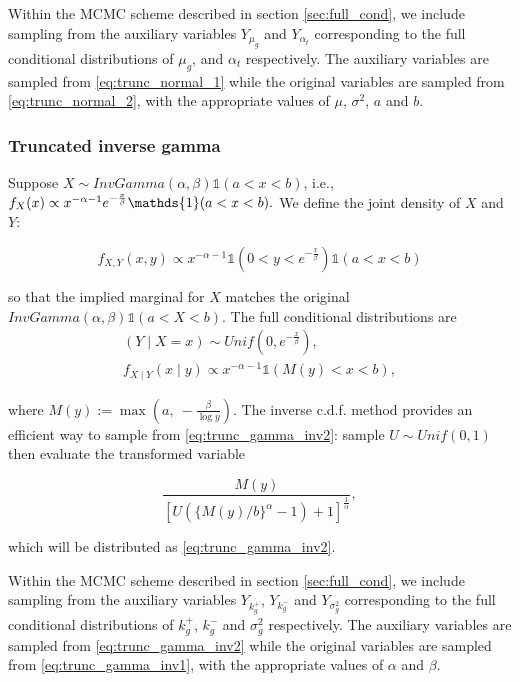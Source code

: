 Within the MCMC scheme described in section \ref{sec:full_cond}, we include sampling from the auxiliary variables $Y_{\mu_g}$ and $Y_{\alpha_t}$ corresponding to the full conditional distributions of $\mu_g$, and $\alpha_t$ respectively. The auxiliary variables are sampled from \eqref{eq:trunc_normal_1} while the original variables are sampled from \eqref{eq:trunc_normal_2}, with the appropriate values of $\mu$, $\sigma^2$, $a$ and $b$.


\subsubsection{Truncated inverse gamma}

Suppose $X \sim InvGamma(\alpha, \beta)\mathds{1}(a<x<b)$, i.e., $f_{X}(x) \propto x^{-\alpha -1} e^{-\frac{x}{\beta}}\\ \mathds{1}(a < x < b).$ We define the joint density of $X$ and $Y$:

$$f_{X,Y}(x, y) \propto x^{-\alpha - 1} \mathds{1}(0<y<e^{-\frac{x}{\beta}})\mathds{1}(a<x<b)$$

\noindent so that the implied marginal for $X$ matches the original $InvGamma(\alpha, \beta)\mathds{1}(a<X<b)$. The full conditional distributions are 
\begin{align}
(Y \mid X=x) \sim Unif(0, e^{-\frac{x}{\beta}}),\label{eq:trunc_gamma_inv1} \\
f_{X\mid Y}(x \mid y) \propto x^{-\alpha -1} \mathds{1}(M(y)<x<b),
\label{eq:trunc_gamma_inv2}
\end{align}

\noindent where $M(y):=\max\left( a, \ -\frac{\beta}{\log y}\right)$. The inverse c.d.f. method provides an efficient way to sample from \eqref{eq:trunc_gamma_inv2}: sample $U \sim Unif(0,1)$ then evaluate the transformed variable 

$$\frac{M(y)}{ \left[U( \{M(y)/b\}^{\alpha} -1 ) + 1\right]^{\frac{1}{\alpha}}},$$

\noindent which  will be distributed as \eqref{eq:trunc_gamma_inv2}. 

Within the MCMC scheme described in section \ref{sec:full_cond}, we include sampling from the auxiliary variables $Y_{k^+_g}$, $Y_{k^-_g}$ and $Y_{\sigma^2_g}$ corresponding to the full conditional distributions of $k^+_g$, $k^-_g$ and $\sigma^2_g$ respectively. The auxiliary variables are sampled from \eqref{eq:trunc_gamma_inv2} while the original variables are sampled from \eqref{eq:trunc_gamma_inv1}, with the appropriate values of $\alpha$ and $\beta$.

